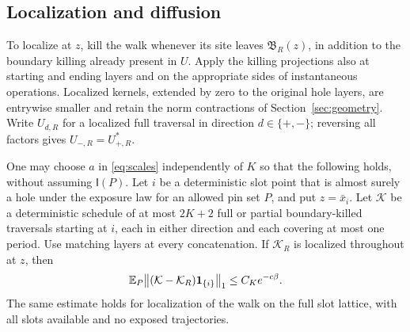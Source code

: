 \subsection{Localization and diffusion}

To localize at \(z\), kill the walk whenever its site leaves
\(\mathfrak B_R(z)\), in addition to the boundary killing already
present in \(U\).  Apply the killing projections also at starting
and ending layers and on the appropriate sides of instantaneous
operations.  Localized kernels, extended by zero to the original
hole layers, are entrywise smaller and retain the norm contractions
of Section~\ref{sec:geometry}.  Write \(U_{d,R}\) for a localized
full traversal in direction \(d\in\{+,-\}\); reversing all factors
gives \(U_{-,R}=U_{+,R}^*\).

\begin{lemma}[Localization]\label{lem:localization}
One may choose \(a\) in \eqref{eq:scales} independently of \(K\)
so that the following holds, without assuming \(\mathsf I(P)\).
Let \(i\) be a deterministic slot point that is almost surely a
hole under the exposure law for an allowed pin set \(P\), and put
\(z=\bar x_i\).  Let \(\mathcal K\) be a deterministic schedule
of at most \(2K+2\) full or partial boundary-killed traversals
starting at \(i\), each in either direction and each covering at
most one period.  Use matching layers at every concatenation.
If \(\mathcal K_R\) is localized throughout at \(z\), then
\begin{equation}\label{eq:localization-loss}
 \mathbb E_P\bigl\|(\mathcal K-\mathcal K_R)
          \mathbf1_{\{i\}}\bigr\|_1\le C_K e^{-c\beta}.
\end{equation}
The same estimate holds for localization of the walk on the full
slot lattice, with all slots available and no exposed trajectories.
\end{lemma}

